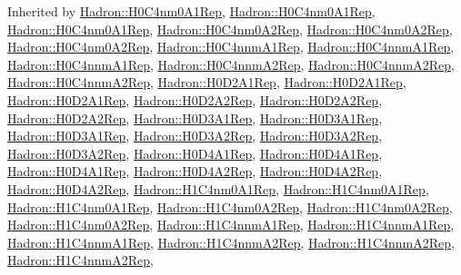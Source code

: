 Inherited by \mbox{\hyperlink{structHadron_1_1H0C4nm0A1Rep}{Hadron\+::\+H0\+C4nm0\+A1\+Rep}}, \mbox{\hyperlink{structHadron_1_1H0C4nm0A1Rep}{Hadron\+::\+H0\+C4nm0\+A1\+Rep}}, \mbox{\hyperlink{structHadron_1_1H0C4nm0A1Rep}{Hadron\+::\+H0\+C4nm0\+A1\+Rep}}, \mbox{\hyperlink{structHadron_1_1H0C4nm0A2Rep}{Hadron\+::\+H0\+C4nm0\+A2\+Rep}}, \mbox{\hyperlink{structHadron_1_1H0C4nm0A2Rep}{Hadron\+::\+H0\+C4nm0\+A2\+Rep}}, \mbox{\hyperlink{structHadron_1_1H0C4nm0A2Rep}{Hadron\+::\+H0\+C4nm0\+A2\+Rep}}, \mbox{\hyperlink{structHadron_1_1H0C4nnmA1Rep}{Hadron\+::\+H0\+C4nnm\+A1\+Rep}}, \mbox{\hyperlink{structHadron_1_1H0C4nnmA1Rep}{Hadron\+::\+H0\+C4nnm\+A1\+Rep}}, \mbox{\hyperlink{structHadron_1_1H0C4nnmA1Rep}{Hadron\+::\+H0\+C4nnm\+A1\+Rep}}, \mbox{\hyperlink{structHadron_1_1H0C4nnmA2Rep}{Hadron\+::\+H0\+C4nnm\+A2\+Rep}}, \mbox{\hyperlink{structHadron_1_1H0C4nnmA2Rep}{Hadron\+::\+H0\+C4nnm\+A2\+Rep}}, \mbox{\hyperlink{structHadron_1_1H0C4nnmA2Rep}{Hadron\+::\+H0\+C4nnm\+A2\+Rep}}, \mbox{\hyperlink{structHadron_1_1H0D2A1Rep}{Hadron\+::\+H0\+D2\+A1\+Rep}}, \mbox{\hyperlink{structHadron_1_1H0D2A1Rep}{Hadron\+::\+H0\+D2\+A1\+Rep}}, \mbox{\hyperlink{structHadron_1_1H0D2A1Rep}{Hadron\+::\+H0\+D2\+A1\+Rep}}, \mbox{\hyperlink{structHadron_1_1H0D2A2Rep}{Hadron\+::\+H0\+D2\+A2\+Rep}}, \mbox{\hyperlink{structHadron_1_1H0D2A2Rep}{Hadron\+::\+H0\+D2\+A2\+Rep}}, \mbox{\hyperlink{structHadron_1_1H0D2A2Rep}{Hadron\+::\+H0\+D2\+A2\+Rep}}, \mbox{\hyperlink{structHadron_1_1H0D3A1Rep}{Hadron\+::\+H0\+D3\+A1\+Rep}}, \mbox{\hyperlink{structHadron_1_1H0D3A1Rep}{Hadron\+::\+H0\+D3\+A1\+Rep}}, \mbox{\hyperlink{structHadron_1_1H0D3A1Rep}{Hadron\+::\+H0\+D3\+A1\+Rep}}, \mbox{\hyperlink{structHadron_1_1H0D3A2Rep}{Hadron\+::\+H0\+D3\+A2\+Rep}}, \mbox{\hyperlink{structHadron_1_1H0D3A2Rep}{Hadron\+::\+H0\+D3\+A2\+Rep}}, \mbox{\hyperlink{structHadron_1_1H0D3A2Rep}{Hadron\+::\+H0\+D3\+A2\+Rep}}, \mbox{\hyperlink{structHadron_1_1H0D4A1Rep}{Hadron\+::\+H0\+D4\+A1\+Rep}}, \mbox{\hyperlink{structHadron_1_1H0D4A1Rep}{Hadron\+::\+H0\+D4\+A1\+Rep}}, \mbox{\hyperlink{structHadron_1_1H0D4A1Rep}{Hadron\+::\+H0\+D4\+A1\+Rep}}, \mbox{\hyperlink{structHadron_1_1H0D4A2Rep}{Hadron\+::\+H0\+D4\+A2\+Rep}}, \mbox{\hyperlink{structHadron_1_1H0D4A2Rep}{Hadron\+::\+H0\+D4\+A2\+Rep}}, \mbox{\hyperlink{structHadron_1_1H0D4A2Rep}{Hadron\+::\+H0\+D4\+A2\+Rep}}, \mbox{\hyperlink{structHadron_1_1H1C4nm0A1Rep}{Hadron\+::\+H1\+C4nm0\+A1\+Rep}}, \mbox{\hyperlink{structHadron_1_1H1C4nm0A1Rep}{Hadron\+::\+H1\+C4nm0\+A1\+Rep}}, \mbox{\hyperlink{structHadron_1_1H1C4nm0A1Rep}{Hadron\+::\+H1\+C4nm0\+A1\+Rep}}, \mbox{\hyperlink{structHadron_1_1H1C4nm0A2Rep}{Hadron\+::\+H1\+C4nm0\+A2\+Rep}}, \mbox{\hyperlink{structHadron_1_1H1C4nm0A2Rep}{Hadron\+::\+H1\+C4nm0\+A2\+Rep}}, \mbox{\hyperlink{structHadron_1_1H1C4nm0A2Rep}{Hadron\+::\+H1\+C4nm0\+A2\+Rep}}, \mbox{\hyperlink{structHadron_1_1H1C4nnmA1Rep}{Hadron\+::\+H1\+C4nnm\+A1\+Rep}}, \mbox{\hyperlink{structHadron_1_1H1C4nnmA1Rep}{Hadron\+::\+H1\+C4nnm\+A1\+Rep}}, \mbox{\hyperlink{structHadron_1_1H1C4nnmA1Rep}{Hadron\+::\+H1\+C4nnm\+A1\+Rep}}, \mbox{\hyperlink{structHadron_1_1H1C4nnmA2Rep}{Hadron\+::\+H1\+C4nnm\+A2\+Rep}}, \mbox{\hyperlink{structHadron_1_1H1C4nnmA2Rep}{Hadron\+::\+H1\+C4nnm\+A2\+Rep}}, \mbox{\hyperlink{structHadron_1_1H1C4nnmA2Rep}{Hadron\+::\+H1\+C4nnm\+A2\+Rep}}, 